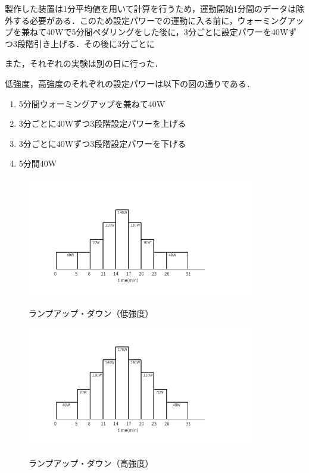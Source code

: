 製作した装置は1分平均値を用いて計算を行うため，運動開始1分間のデータは除外する必要がある．このため設定パワーでの運動に入る前に，ウォーミングアップを兼ねて40Wで5分間ペダリングをした後に，3分ごとに設定パワーを40Wずつ3段階引き上げる．その後に3分ごとに

また，それぞれの実験は別の日に行った．

低強度，高強度のそれぞれの設定パワーは以下の図の通りである．

\begin{enumerate}
  \item 5分間ウォーミングアップを兼ねて40W
  \item 3分ごとに40Wずつ3段階設定パワーを上げる
  \item 3分ごとに40Wずつ3段階設定パワーを下げる
  \item 5分間40W
\end{enumerate}

\begin{figure}[h]
  \begin{center}
    \label{fig:protocol_rampup_light}
    \includegraphics[width=10cm]{fig/protocol_rampup_light.pdf}
    \caption{ランプアップ・ダウン（低強度）}
  \end{center}
\end{figure}

\begin{figure}[h]
  \begin{center}
    \label{fig:protocol_rampup_hard}
    \includegraphics[width=10cm]{fig/protocol_rampup_hard.pdf}
    \caption{ランプアップ・ダウン（高強度）}
  \end{center}
\end{figure}


